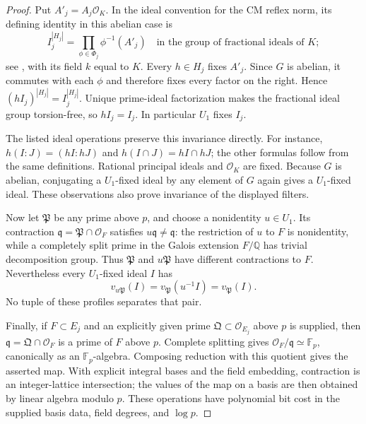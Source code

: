 \documentclass[11pt]{article}
\theoremstyle{definition}
\theoremstyle{remark}
\begin{document}
\begin{proof}
Put $A'_j=A_j\mathcal O_K$.  In the ideal convention for the
CM reflex norm, its defining identity in this abelian case is
\[
 I_j^{|H_j|}
   =\prod_{\phi\in\Phi_j}\phi^{-1}(A'_j)
 \quad\text{in the group of fractional ideals of }K;
\]
see \citet[Corollary~1.27, p.~17]{MilneCM2020}, with its field
$k$ equal to $K$.  Every $h\in H_j$ fixes $A'_j$.
Since $G$ is abelian, it commutes with each $\phi$ and therefore
fixes every factor on the right.  Hence
$(hI_j)^{|H_j|}=I_j^{|H_j|}$.  Unique prime-ideal factorization
makes the fractional ideal group torsion-free, so $hI_j=I_j$.
In particular $U_1$ fixes $I_j$.

The listed ideal operations preserve this invariance directly.
For instance,
$h(I:J)=(hI:hJ)$ and
$h(I\cap J)=hI\cap hJ$; the other formulas follow from the
same definitions.  Rational principal ideals and $\mathcal O_K$
are fixed.  Because $G$ is abelian, conjugating a $U_1$-fixed
ideal by any element of $G$ again gives a $U_1$-fixed ideal.
These observations also prove invariance of the displayed filters.

Now let $\mathfrak P$ be any prime above $p$, and choose a
nonidentity $u\in U_1$.  Its contraction
$\mathfrak q=\mathfrak P\cap\mathcal O_F$ satisfies
$u\mathfrak q\ne\mathfrak q$: the restriction of $u$ to $F$
is nonidentity, while a completely split prime in the Galois
extension $F/\mathbb Q$ has trivial decomposition group.
Thus $\mathfrak P$ and $u\mathfrak P$ have different
contractions to $F$.  Nevertheless every $U_1$-fixed ideal $I$
has
\[
 v_{u\mathfrak P}(I)
   =v_{\mathfrak P}(u^{-1}I)
   =v_{\mathfrak P}(I).
\]
No tuple of these profiles separates that pair.

Finally, if $F\subset E_j$ and an explicitly given prime
$\mathfrak Q\subset\mathcal O_{E_j}$ above $p$ is supplied,
then $\mathfrak q=\mathfrak Q\cap\mathcal O_F$ is a
prime of $F$ above $p$.  Complete splitting gives
$\mathcal O_F/\mathfrak q\simeq\mathbb F_p$, canonically as an
$\mathbb F_p$-algebra.  Composing reduction with this quotient
gives the asserted map.  With explicit integral bases and the
field embedding, contraction is an integer-lattice intersection;
the values of the map on a basis are then obtained by linear
algebra modulo $p$.  These operations have polynomial bit cost
in the supplied basis data, field degrees, and $\log p$.
\end{proof}
\end{document}
